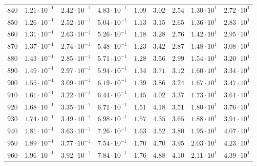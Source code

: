 \begin{landscape}
\begin{table}
\begin{tabular}{lcccccccc}
$	840	$ & $	1.21 \cdot 10^{-1} 	$ & $	2.42 \cdot 10^{-1} 	$ & $	4.83 \cdot 10^{-1} 	$ & $	1.09 	$ & $	3.02 	$ & $	2.54 	$ & $	1.30 \cdot 10^{1} 	$ & $	2.72 \cdot 10^{1} 	 $ \\
$	850	$ & $	1.26 \cdot 10^{-1} 	$ & $	2.52 \cdot 10^{-1} 	$ & $	5.04 \cdot 10^{-1} 	$ & $	1.13 	$ & $	3.15 	$ & $	2.65 	$ & $	1.36 \cdot 10^{1} 	$ & $	2.83 \cdot 10^{1} 	 $ \\
$	860	$ & $	1.31 \cdot 10^{-1} 	$ & $	2.63 \cdot 10^{-1} 	$ & $	5.26 \cdot 10^{-1} 	$ & $	1.18 	$ & $	3.28 	$ & $	2.76 	$ & $	1.42 \cdot 10^{1} 	$ & $	2.95 \cdot 10^{1} 	 $ \\
$	870	$ & $	1.37 \cdot 10^{-1} 	$ & $	2.74 \cdot 10^{-1} 	$ & $	5.48 \cdot 10^{-1} 	$ & $	1.23 	$ & $	3.42 	$ & $	2.87 	$ & $	1.48 \cdot 10^{1} 	$ & $	3.08 \cdot 10^{1} 	 $ \\
$	880	$ & $	1.43 \cdot 10^{-1} 	$ & $	2.85 \cdot 10^{-1} 	$ & $	5.71 \cdot 10^{-1} 	$ & $	1.28 	$ & $	3.56 	$ & $	2.99 	$ & $	1.54 \cdot 10^{1} 	$ & $	3.20 \cdot 10^{1} 	 $ \\
$	890	$ & $	1.49 \cdot 10^{-1} 	$ & $	2.97 \cdot 10^{-1} 	$ & $	5.94 \cdot 10^{-1} 	$ & $	1.34 	$ & $	3.71 	$ & $	3.12 	$ & $	1.60 \cdot 10^{1} 	$ & $	3.34 \cdot 10^{1} 	 $ \\
$	900	$ & $	1.55 \cdot 10^{-1} 	$ & $	3.09 \cdot 10^{-1} 	$ & $	6.19 \cdot 10^{-1} 	$ & $	1.39 	$ & $	3.86 	$ & $	3.24 	$ & $	1.67 \cdot 10^{1} 	$ & $	3.47 \cdot 10^{1} 	 $ \\
$	910	$ & $	1.61 \cdot 10^{-1} 	$ & $	3.22 \cdot 10^{-1} 	$ & $	6.44 \cdot 10^{-1} 	$ & $	1.45 	$ & $	4.02 	$ & $	3.37 	$ & $	1.73 \cdot 10^{1} 	$ & $	3.61 \cdot 10^{1} 	 $ \\
$	920	$ & $	1.68 \cdot 10^{-1} 	$ & $	3.35 \cdot 10^{-1} 	$ & $	6.71 \cdot 10^{-1} 	$ & $	1.51 	$ & $	4.18 	$ & $	3.51 	$ & $	1.80 \cdot 10^{1} 	$ & $	3.76 \cdot 10^{1} 	 $ \\
$	930	$ & $	1.74 \cdot 10^{-1} 	$ & $	3.49 \cdot 10^{-1} 	$ & $	6.98 \cdot 10^{-1} 	$ & $	1.57 	$ & $	4.35 	$ & $	3.65 	$ & $	1.88 \cdot 10^{1} 	$ & $	3.91 \cdot 10^{1} 	 $ \\
$	940	$ & $	1.81 \cdot 10^{-1} 	$ & $	3.63 \cdot 10^{-1} 	$ & $	7.26 \cdot 10^{-1} 	$ & $	1.63 	$ & $	4.52 	$ & $	3.80 	$ & $	1.95 \cdot 10^{1} 	$ & $	4.07 \cdot 10^{1} 	 $ \\
$	950	$ & $	1.89 \cdot 10^{-1} 	$ & $	3.77 \cdot 10^{-1} 	$ & $	7.54 \cdot 10^{-1} 	$ & $	1.70 	$ & $	4.70 	$ & $	3.95 	$ & $	2.03 \cdot 10^{1} 	$ & $	4.23 \cdot 10^{1} 	 $ \\
$	960	$ & $	1.96 \cdot 10^{-1} 	$ & $	3.92 \cdot 10^{-1} 	$ & $	7.84 \cdot 10^{-1} 	$ & $	1.76 	$ & $	4.88 	$ & $	4.10 	$ & $	2.11 \cdot 10^{1} 	$ & $	4.39 \cdot 10^{1} 	 $ \\

\end{tabular}
\end{table}
\end{landscape}
